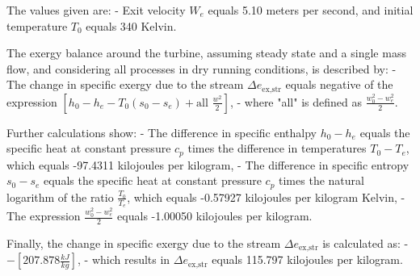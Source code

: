 The values given are:
- Exit velocity \( W_e \) equals 5.10 meters per second, and initial temperature \( T_0 \) equals 340 Kelvin.

The exergy balance around the turbine, assuming steady state and a single mass flow, and considering all processes in dry running conditions, is described by:
- The change in specific exergy due to the stream \( \Delta e_{\text{ex,str}} \) equals negative of the expression \([ h_0 - h_e - T_0 (s_0 - s_e) + \text{all } \frac{w^2}{2} ]\),
- where "all" is defined as \(\frac{w_0^2 - w_e^2}{2}\).

Further calculations show:
- The difference in specific enthalpy \( h_0 - h_e \) equals the specific heat at constant pressure \( c_p \) times the difference in temperatures \( T_0 - T_e \), which equals -97.4311 kilojoules per kilogram,
- The difference in specific entropy \( s_0 - s_e \) equals the specific heat at constant pressure \( c_p \) times the natural logarithm of the ratio \( \frac{T_0}{T_e} \), which equals -0.57927 kilojoules per kilogram Kelvin,
- The expression \(\frac{w_0^2 - w_e^2}{2}\) equals -1.00050 kilojoules per kilogram.

Finally, the change in specific exergy due to the stream \( \Delta e_{\text{ex,str}} \) is calculated as:
- \(-[ 207.878 \frac{kJ}{kg} ]\),
- which results in \( \Delta e_{\text{ex,str}} \) equals 115.797 kilojoules per kilogram.